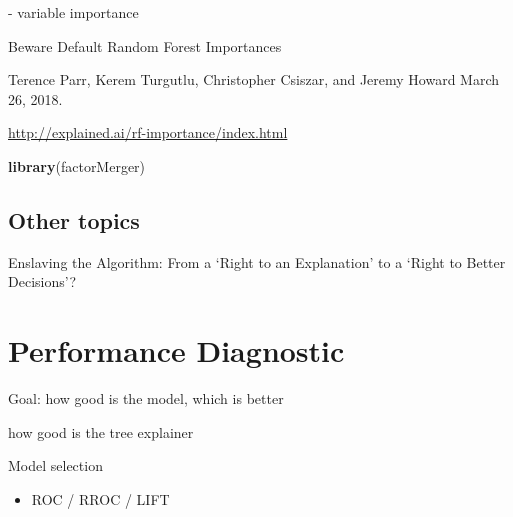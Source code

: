 \documentclass[12pt,]{krantz}
\newenvironment{Shaded}{\begin{snugshade}}{\end{snugshade}}
\newcommand{\KeywordTok}[1]{\textcolor[rgb]{0.13,0.29,0.53}{\textbf{#1}}}
\newcommand{\NormalTok}[1]{#1}
\providecommand{\tightlist}{%
  \setlength{\itemsep}{0pt}\setlength{\parskip}{0pt}}
\begin{document}
\citep{RJ2017016}
\citep{MAGIX}

\citep{R-factorMerger}

\citep{Strobl2007}
\citep{Strobl2008}
- variable importance

\citep{2018arXiv180101489F}

Beware Default Random Forest Importances

Terence Parr, Kerem Turgutlu, Christopher Csiszar, and Jeremy Howard
March 26, 2018.

\url{http://explained.ai/rf-importance/index.html}

\begin{Shaded}
\begin{Highlighting}[]
\KeywordTok{library}\NormalTok{(factorMerger)}
\end{Highlighting}
\end{Shaded}

\hypertarget{other-topics}{%
\subsection{Other topics}\label{other-topics}}

Enslaving the Algorithm: From a `Right to an Explanation' to a `Right to Better Decisions'?
\citep{Edwards_Veale_2018}

\citep{R-randomForestExplainer}
\citep{R-ICEbox}
\citep{R-ALEPlot}

\citep{R-modelDown}

\hypertarget{performanceDiagnostic}{%
\section{Performance Diagnostic}\label{performanceDiagnostic}}

Goal: how good is the model, which is better

\citep{Piltaver2016} how good is the tree explainer

Model selection

\begin{itemize}
\tightlist
\item
  ROC / RROC / LIFT
\end{itemize}
\end{document}
